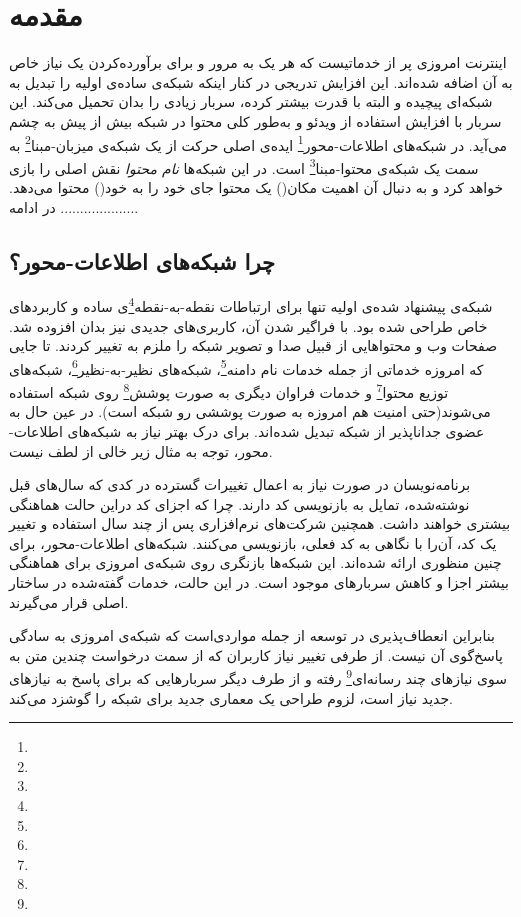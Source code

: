 \chapter{مقدمه}

اینترنت امروزی پر از خدماتیست که هر یک به مرور و برای برآورده‌کردن یک نیاز خاص به آن اضافه شده‌اند. این افزایش تدریجی در کنار اینکه شبکه‌ی ساده‌ی اولیه را تبدیل به شبکه‌ای پیچیده و البته با قدرت بیشتر کرده، سربار‌ زیادی را بدان تحمیل می‌کند. این سربار با افزایش استفاده از ویدئو و به‌طور کلی محتوا در شبکه بیش از پیش به چشم می‌آید. در شبکه‌های اطلاعات-محور\footnote{} ایده‌ی اصلی حرکت از یک شبکه‌ی میزبان-مبنا\footnote{} به سمت یک شبکه‌ی محتوا-مبنا\footnote{} است. در این شبکه‌ها \textit{نام محتوا} نقش اصلی را بازی خواهد کرد و به دنبال آن اهمیت مکان() یک محتوا جای خود را به خود() محتوا می‌دهد. در ادامه ....................


\section{چرا شبکه‌های اطلاعات-محور؟}
شبکه‌ی پیشنهاد شده‌ی اولیه تنها برای ارتباطات نقطه-به-نقطه\footnote{}ی ساده و کاربردهای خاص طراحی شده بود. با فراگیر شدن آن، کاربری‌های جدیدی نیز بدان افزوده شد. صفحات وب و محتواهایی از قبیل صدا و تصویر شبکه را ملزم به تغییر کردند. تا جایی که امروزه خدماتی از جمله خدمات نام دامنه\footnote{}، شبکه‌های نظیر-به-نظیر\footnote{}، شبکه‌های توزیع محتوا\footnote{} و خدمات فراوان دیگری به صورت پوشش\footnote{} روی شبکه استفاده می‌شوند(حتی امنیت هم امروزه به صورت پوششی رو شبکه است). در عین حال به عضوی جداناپذیر از شبکه تبدیل شده‌اند. برای درک بهتر نیاز به شبکه‌های اطلاعات-محور، توجه به مثال زیر خالی از لطف نیست.

برنامه‌نویسان در صورت نیاز به اعمال تغییرات گسترده در کدی که سال‌های قبل نوشته‌شده، تمایل به بازنویسی کد دارند. چرا که اجزای کد  دراین حالت هماهنگی بیشتری خواهند داشت. همچنین شرکت‌های نرم‌افزاری پس از چند سال استفاده و تغییر یک کد، آن‌را با نگاهی به کد فعلی، بازنویسی می‌کنند. شبکه‌های اطلاعات-محور، برای چنین منظوری ارائه شده‌اند. این شبکه‌ها بازنگری روی شبکه‌ی امروزی برای هماهنگی بیشتر اجزا و کاهش سربارهای موجود است. در این حالت، خدمات گفته‌شده در ساختار اصلی قرار می‌گیرند.

بنابراین انعطاف‌پذیری در توسعه از جمله مواردی‌است که شبکه‌ی امروزی به سادگی پاسخ‌گوی آن نیست. از طرفی تغییر نیاز کاربران که از سمت درخواست چندین متن به سوی نیازهای چند رسانه‌ای\footnote{} رفته و از طرف دیگر سربار‌هایی که برای پاسخ به نیازهای جدید نیاز است،  لزوم طراحی یک معماری جدید برای شبکه را گوشزد می‌کند.

